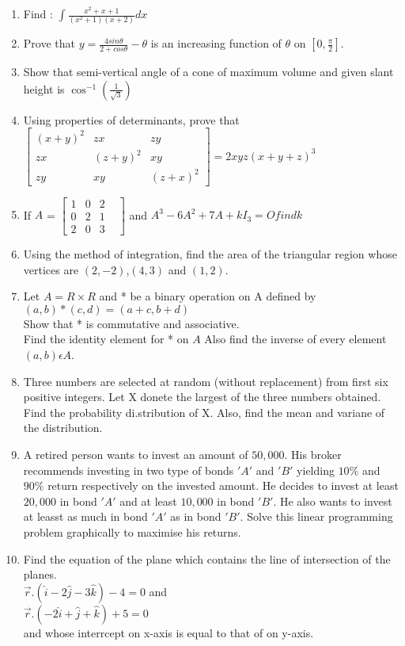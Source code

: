 \documentclass[12pt,-letter paper]{article}
\providecommand{\myvec}[1]{\ensuremath{\begin{bmatrix}#1\end{bmatrix}}}
\begin{document}
\begin{enumerate}
\item Find : $\int\frac{x^2+x+1}{(x^2+1)(x+2)}dx$
\item Prove that $y=\frac{4sin\theta}{2+cos\theta}-\theta$ is an increasing function of $\theta$ on $[0,\frac{\pi}{2}]$.
\item Show that semi-vertical angle of a cone of maximum volume and given slant height is $\cos^{-1}(\frac{1}{\sqrt{3}})$
\item Using properties of determinants, prove that \\
 $\myvec{(x+y)^2 & zx & zy \\zx & (z+y)^2 & xy \\zy & xy & (z+x)^2} = 2xyz(x+y+z)^3$
\item If $A$ = $\myvec{ 1&0&2&\\0&2&1\\2&0&3&}$ and $A^3-6A^2+7A+kI_3 = O find k$
\item Using the method of integration, find the area of the triangular region whose vertices are $(2, -2)$,$(4, 3)$ and $(1, 2)$.
\item Let $A=R \times R$ and * be a binary operation on A defined by \\ $(a, b)*(c, d)=(a+c, b+d)$ \\ Show that * is commutative and associative. \\ Find the identity element for * on $A$ Also find the inverse of every element $(a, b)\epsilon A$.
\item Three numbers are selected at random (without replacement) from first six positive integers. Let X donete the largest of the three numbers obtained. Find the probability di.stribution of X. Also, find the mean and variane of the distribution.
\item A retired person wants to invest an amount of \rupee $50,000$. His broker recommends investing in two type of bonds $'A'$ and $'B'$ yielding $10\%$ and $90\%$ return respectively on the invested amount. He decides to invest at least \rupee $20,000$ in bond $'A'$ and at least \rupee $10,000$ in bond $'B'$. He also wants to invest at leasst as much in bond $'A'$ as in bond $'B'$. Solve this linear  programming problem graphically to maximise his returns. 
\item Find the equation of the plane which contains the line of intersection of the planes. \\ $\overrightarrow{r}$.$(\hat{i}-2\hat{j}-3\hat{k})-4=0$ and \\ $\overrightarrow{r}$.$(-2\hat{i}+\hat{j}+\hat{k})+5=0$ \\ and whose interrcept on x-axis is equal to that of on y-axis.	
\end{enumerate}
\end{document}
